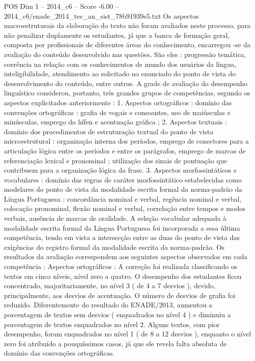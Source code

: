 \begin{textsample}{POS Dim 1 – 2014\_c6 – Score -6.00 – 2014\_c6/enade\_2014\_tec\_an\_sist\_78b91939e5.txt}
Os aspectos macroestruturais da elaboração do texto não foram avaliados neste processo, para não penalizar duplamente os estudantes, já que a banca de formação geral, composta por profissionais de diferentes áreas do conhecimento, encarregou -se da avaliação do conteúdo desenvolvido nas questões.
São eles : progressão temática, coerência na relação com os conhecimentos de mundo dos usuários da língua, inteligibilidade, atendimento ao solicitado no enunciado do ponto de vista do desenvolvimento do conteúdo, entre outros.
A grade de avaliação do desempenho linguístico considerou, portanto, três grandes grupos de competências, segundo os aspectos explicitados anteriormente : 1.
Aspectos ortográficos : domínio das convenções ortográficas : grafia de vogais e consoantes, uso de maiúsculas e minúsculas, emprego do hífen e acentuação gráfica ; 2.
Aspectos textuais : domínio dos procedimentos de estruturação textual do ponto de vista microestrutural : organização interna dos períodos, emprego de conectores para a articulação lógica entre os períodos e entre os parágrafos, emprego de marcas de referenciação lexical e pronominal ; utilização dos sinais de pontuação que contribuem para a organização lógica da frase. 3.
Aspectos morfossintáticos e vocabulares : domínio das regras de caráter morfossintático estabelecidas como modelares do ponto de vista da modalidade escrita formal da norma-padrão da Língua Portuguesa : concordância nominal e verbal, regência nominal e verbal, colocação pronominal, flexão nominal e verbal, correlação entre tempos e modos verbais, ausência de marcas de oralidade.
A seleção vocabular adequada à modalidade escrita formal da Língua Portuguesa foi incorporada a essa última competência, tendo em vista a intersecção entre as duas do ponto de vista das exigências do registro formal da modalidade escrita da norma-padrão.
Os resultados da avaliação correspondem aos seguintes aspectos observados em cada competência : Aspectos ortográficos : A correção foi realizada classificando os textos em cinco níveis, nível zero a quatro.
O desempenho dos estudantes ficou concentrado, majoritariamente, no nível 3 ( de 4 a 7 desvios ), devido, principalmente, aos desvios de acentuação.
O número de desvios de grafia foi reduzido.
Diferentemente do resultado do ENADE/2013, aumentou a porcentagem de textos sem desvios ( enquadrados no nível 4 ) e diminuiu a porcentagem de textos enquadrados no nível 2.
Alguns textos, com pior desempenho, foram enquadrados no nível 1 ( de 8 a 12 desvios ), enquanto o nível zero foi atribuído a pouquíssimos casos, já que ele revela falta absoluta de domínio das convenções ortográficas.

\end{textsample}
